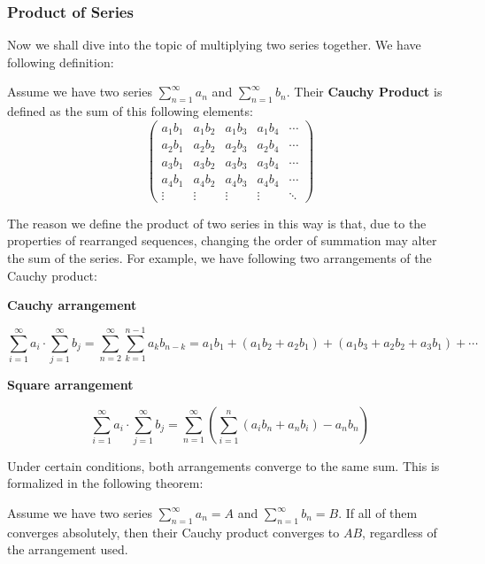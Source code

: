 \subsubsection{Product of Series}
Now we shall dive into the topic of multiplying two series together. We have following definition:

\begin{definition}
    Assume we have two series $\sum_{n=1}^{\infty} a_n$ and $\sum_{n=1}^{\infty} b_n$. Their \textbf{Cauchy Product} is defined as the sum of this following elements:
    \[\begin{pmatrix}
        a_1 b_1 & a_1 b_2 & a_1 b_3 & a_1 b_4 & \cdots \\
        a_2 b_1 & a_2 b_2 & a_2 b_3 & a_2 b_4 & \cdots \\
        a_3 b_1 & a_3 b_2 & a_3 b_3 & a_3 b_4 & \cdots \\
        a_4 b_1 & a_4 b_2 & a_4 b_3 & a_4 b_4 & \cdots \\
    \vdots   & \vdots   & \vdots   & \vdots   & \ddots
    \end{pmatrix}\]
\end{definition}

The reason we define the product of two series in this way is that, due to the properties of rearranged sequences, changing the order of summation may alter the sum of the series. For example, we have following two arrangements of the Cauchy product:

\textbf{Cauchy arrangement}

\[
\sum_{i=1}^{\infty} a_i \cdot \sum_{j=1}^{\infty} b_j = \sum_{n=2}^{\infty} \sum_{k=1}^{n-1} a_k b_{n-k} = a_1 b_1 + (a_1 b_2 + a_2 b_1) + (a_1 b_3 + a_2 b_2 + a_3 b_1) + \cdots
\]

\textbf{Square arrangement}

\[
\sum_{i=1}^{\infty} a_i \cdot \sum_{j=1}^{\infty} b_j = \sum_{n=1}^{\infty} \left(\sum_{i=1}^{n}(a_i b_n+ a_n b_i) - a_n b_n \right)
\]

Under certain conditions, both arrangements converge to the same sum. This is formalized in the following theorem:

\begin{theorem}
    Assume we have two series $\sum_{n=1}^{\infty} a_n = A$ and $\sum_{n=1}^{\infty} b_n = B$. If all of them converges absolutely, then their Cauchy product converges to $AB$, regardless of the arrangement used.
\end{theorem}

